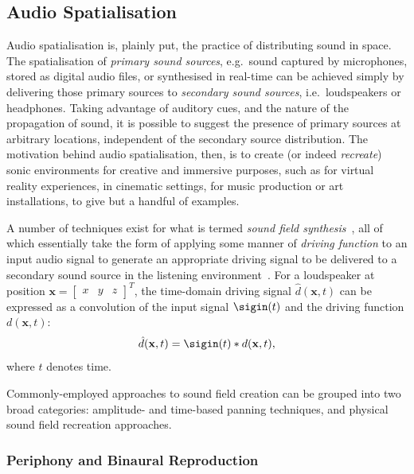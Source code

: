 \subsection{Audio Spatialisation}\label{subsec:audio-spatialisation}

Audio spatialisation is, plainly put, the practice of distributing sound in
space.
The spatialisation of \textit{primary sound sources}, e.g.\ sound
captured by microphones, stored as digital audio files, or synthesised in
real-time can be achieved simply by delivering those primary sources to
\textit{secondary sound sources}, i.e.\ loudspeakers or headphones.
Taking advantage of auditory cues, and the nature of the propagation of sound,
it is possible to suggest the presence of primary sources at arbitrary
locations, independent of the secondary source distribution.
The motivation behind audio spatialisation, then, is to create (or indeed
\textit{recreate}) sonic environments for creative and immersive purposes, such
as for virtual reality experiences, in cinematic settings, for music production
or art installations, to give but a handful of examples.

A number of techniques exist for what is termed \textit{sound field
synthesis}~\citep{ahrens_analytic_2012,nicol_sound_2017}, all of which
essentially take the form of applying some manner of \textit{driving function}
to an input audio signal to generate an appropriate driving signal to be
delivered to a secondary sound source in the listening
environment~\citep{ahrens_analytic_2012}.
For a loudspeaker at position $\mathbf{x} = \begin{bmatrix}
                                                x & y & z
\end{bmatrix}^T$, the time-domain driving signal $\hat{d}(\mathbf{x},t)$
can be expressed as a convolution of the input signal $\sigin(t)$ and the
driving function $d(\mathbf{x},t)$:
\begin{equation}
    \label{eq:driving-signal-time}
    \hat{d}(\mathbf{x},t) = \sigin(t) \ast d(\mathbf{x},t),
\end{equation}
where $t$ denotes time.

Commonly-employed approaches to sound field creation can be grouped into two
broad categories: amplitude- and time-based panning techniques, and physical
sound field recreation approaches.

\subsubsection{Periphony and Binaural Reproduction}\label{subsubsec:periphony}


